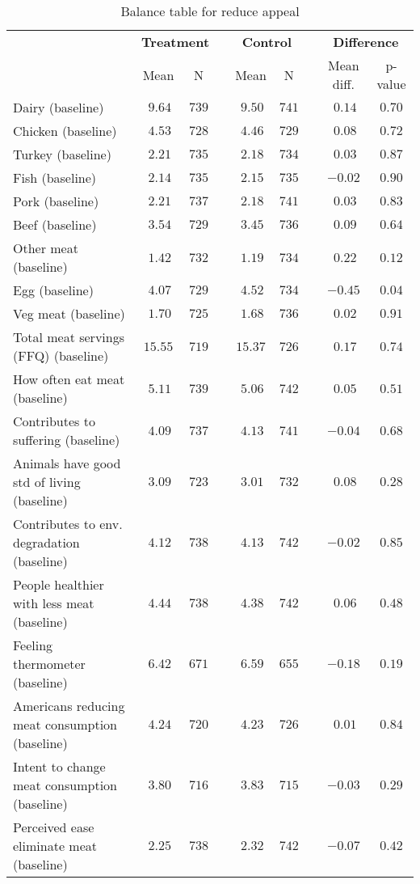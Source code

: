 \begin{table*}[ht]
\caption{Balance table for reduce appeal\label{dataframe}} 
\begin{center}
\begin{tabular}{lcccccccc}
\hline\hline
\multicolumn{1}{l}{\bfseries }&\multicolumn{2}{c}{\bfseries Treatment}&\multicolumn{1}{c}{\bfseries }&\multicolumn{2}{c}{\bfseries Control}&\multicolumn{1}{c}{\bfseries }&\multicolumn{2}{c}{\bfseries Difference}\tabularnewline
\cline{2-3} \cline{5-6} \cline{8-9}
\multicolumn{1}{l}{}&\multicolumn{1}{c}{Mean}&\multicolumn{1}{c}{N}&\multicolumn{1}{c}{}&\multicolumn{1}{c}{Mean}&\multicolumn{1}{c}{N}&\multicolumn{1}{c}{}&\multicolumn{1}{c}{Mean diff.}&\multicolumn{1}{c}{p-value}\tabularnewline
\hline
Dairy (baseline)&$~9.64$&$739$&&$~9.50$&$741$&&$~0.14$&$0.70$\tabularnewline
Chicken (baseline)&$~4.53$&$728$&&$~4.46$&$729$&&$~0.08$&$0.72$\tabularnewline
Turkey (baseline)&$~2.21$&$735$&&$~2.18$&$734$&&$~0.03$&$0.87$\tabularnewline
Fish (baseline)&$~2.14$&$735$&&$~2.15$&$735$&&$-0.02$&$0.90$\tabularnewline
Pork (baseline)&$~2.21$&$737$&&$~2.18$&$741$&&$~0.03$&$0.83$\tabularnewline
Beef (baseline)&$~3.54$&$729$&&$~3.45$&$736$&&$~0.09$&$0.64$\tabularnewline
Other meat (baseline)&$~1.42$&$732$&&$~1.19$&$734$&&$~0.22$&$0.12$\tabularnewline
Egg (baseline)&$~4.07$&$729$&&$~4.52$&$734$&&$-0.45$&$0.04$\tabularnewline
Veg meat (baseline)&$~1.70$&$725$&&$~1.68$&$736$&&$~0.02$&$0.91$\tabularnewline
Total meat servings (FFQ) (baseline)&$15.55$&$719$&&$15.37$&$726$&&$~0.17$&$0.74$\tabularnewline
How often eat meat (baseline)&$~5.11$&$739$&&$~5.06$&$742$&&$~0.05$&$0.51$\tabularnewline
Contributes to suffering (baseline)&$~4.09$&$737$&&$~4.13$&$741$&&$-0.04$&$0.68$\tabularnewline
Animals have good std of living (baseline)&$~3.09$&$723$&&$~3.01$&$732$&&$~0.08$&$0.28$\tabularnewline
Contributes to env. degradation (baseline)&$~4.12$&$738$&&$~4.13$&$742$&&$-0.02$&$0.85$\tabularnewline
People healthier with less meat (baseline)&$~4.44$&$738$&&$~4.38$&$742$&&$~0.06$&$0.48$\tabularnewline
Feeling thermometer (baseline)&$~6.42$&$671$&&$~6.59$&$655$&&$-0.18$&$0.19$\tabularnewline
Americans reducing meat consumption (baseline)&$~4.24$&$720$&&$~4.23$&$726$&&$~0.01$&$0.84$\tabularnewline
Intent to change meat consumption (baseline)&$~3.80$&$716$&&$~3.83$&$715$&&$-0.03$&$0.29$\tabularnewline
Perceived ease eliminate meat (baseline)&$~2.25$&$738$&&$~2.32$&$742$&&$-0.07$&$0.42$\tabularnewline

\end{tabular}
\end{center}
\end{table*}
